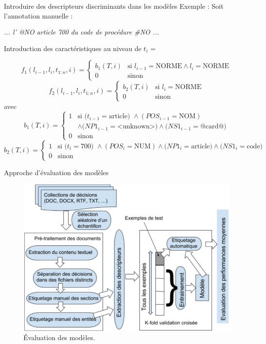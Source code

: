 \documentclass[newPxFont,pagenumber]{beamer}
\begin{document}
\begin{frame}[c]{Introduire des descripteurs discriminants dans les modèles}
Exemple : Soit l'annotation manuelle : 

\og \textit{... l' @NO article 700 du code de procédure \#NO ...} \fg{}

Introduction des caractéristiques au niveau de $t_i$ =  \fg{}
\footnotesize


\[f_1(l_{i-1},l_i,t_{1:n},i) = \left\lbrace \begin{array}{ll}
b_1(T,i) & \text{si } l_{i-1} = \text{NORME} \wedge l_i = \text{NORME} \\
0 & \text{sinon}
\end{array} \right.\]
\[f_2(l_{i-1},l_i,t_{1:n},i) = \left\lbrace \begin{array}{ll}
b_2(T,i) & \text{si }l_i = \text{NORME} \\
0 & \text{sinon}
\end{array} \right.\]
avec 
\[b_1(T,i) = \left\lbrace \begin{array}{ll}
1 & \text{si } (t_{i-1} =\text{article) }\wedge (POS_{i-1}=\text{NOM}) \\ &  \wedge  (NP1_{i-1}=\text{<unknown>)} \wedge (NS1_{i-1}=\text{@card@)} \\
0 & \text{sinon} 
\end{array} \right.\]
\[b_2(T,i) = \left\lbrace \begin{array}{ll}
1 & \text{si } (t_i =\text{700) }\wedge (POS_i=\text{NUM})  \wedge (NP1_i=\text{article)} \wedge (NS1_i=\text{code)} \\
0 & \text{sinon}
\end{array} \right.\]

\cite{Wallach2004crfintro}
\end{frame}


\begin{frame}[c]{Approche d'évaluation des modèles}
\begin{figure}[t]
\centering \includegraphics[scale=0.5]{archEval.PNG}
\caption{Évaluation des modèles.}
\end{figure}
\end{frame}
\end{document}
